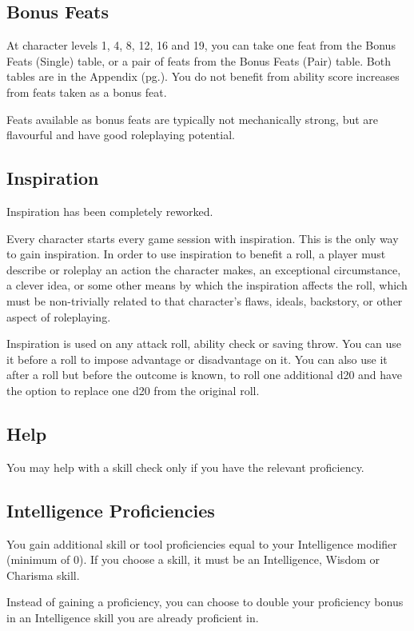\documentclass[letterpaper,twocolumn,openany,nodeprecatedcode]{dndbook}
\newcommand{\pg}[1]{pg.\pageref{#1}}
\begin{document}
\label{gameplay-feats-bonus}
\subsection{Bonus Feats}
At character levels 1, 4, 8, 12, 16 and 19, you can take one feat from the Bonus Feats (Single) table, or a pair of feats from the Bonus Feats (Pair) table. Both tables are in the Appendix (\pg{appendix-feats-bonus-table}). You do not benefit from ability score increases from feats taken as a bonus feat.

Feats available as bonus feats are typically not mechanically strong, but are flavourful and have good roleplaying potential.

\subsection{Inspiration}
Inspiration has been completely reworked.

Every character starts every game session with inspiration. This is the only way to gain inspiration. In order to use inspiration to benefit a roll, a player must describe or roleplay an action the character makes, an exceptional circumstance, a clever idea, or some other means by which the inspiration affects the roll, which must be non-trivially related to that character's flaws, ideals, backstory, or other aspect of roleplaying.

Inspiration is used on any attack roll, ability check or saving throw. You can use it before a roll to impose advantage or disadvantage on it. You can also use it after a roll but before the outcome is known, to roll one additional d20 and have the option to replace one d20 from the original roll. 

\subsection{Help}
You may help with a skill check only if you have the relevant proficiency.

\subsection{Intelligence Proficiencies}
You gain additional skill or tool proficiencies equal to your Intelligence modifier (minimum of 0). If you choose a skill, it must be an Intelligence, Wisdom or Charisma skill. 

Instead of gaining a proficiency, you can choose to double your proficiency bonus in an Intelligence skill you are already proficient in.
\end{document}
